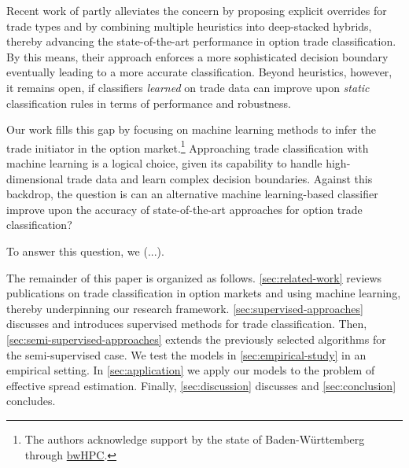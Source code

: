 Recent work of \textcite[][13--16]{grauerOptionTradeClassification2022} partly alleviates the concern by proposing explicit overrides for trade types and by combining multiple heuristics into deep-stacked hybrids, thereby advancing the state-of-the-art performance in option trade classification. By this means, their approach enforces a more sophisticated decision boundary eventually leading to a more accurate classification. Beyond heuristics, however, it remains open, if classifiers \emph{learned} on trade data can improve upon \emph{static} classification rules in terms of performance and robustness.

Our work fills this gap by focusing on machine learning methods to infer the trade initiator in the option market.\footnote{The authors acknowledge support by the state of Baden-Württemberg through \href{https://www.bwhpc.de/}{bwHPC}.} Approaching trade classification with machine learning is a logical choice, given its capability to handle high-dimensional trade data and learn complex decision boundaries. Against this backdrop, the question is can an alternative machine learning-based classifier improve upon the accuracy of state-of-the-art approaches for option trade classification?

To answer this question, we (...). 

The remainder of this paper is organized as follows. \cref{sec:related-work} reviews publications on trade classification in option markets and using machine learning, thereby underpinning our research framework. \cref{sec:supervised-approaches} discusses and introduces supervised methods for trade classification. Then, \cref{sec:semi-supervised-approaches} extends the previously selected algorithms for the semi-supervised case. We test the models in \cref{sec:empirical-study} in an empirical setting. In \cref{sec:application} we apply our models to the problem of effective spread estimation. Finally, \cref{sec:discussion} discusses and \cref{sec:conclusion} concludes.

